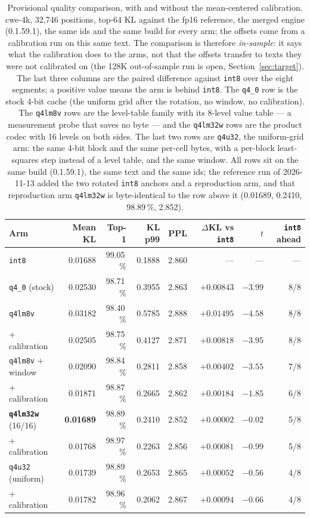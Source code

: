 \documentclass[10pt,twocolumn]{article}
\begin{document}
\begin{table}[t]
\centering
\footnotesize
\caption{Provisional quality comparison, with and without the mean-centered calibration. cwe-4k, 32,746 positions, top-64 KL against the fp16 reference, the merged engine (0.1.59.1), the same ids and the same build for every arm; the offsets come from a calibration run on this same text. The comparison is therefore \emph{in-sample}: it says what the calibration does to the arms, not that the offsets transfer to texts they were not calibrated on (the 128K out-of-sample run is open, Section~\ref{sec:target}). The last three columns are the paired difference against \texttt{int8} over the eight segments; a positive value means the arm is behind \texttt{int8}. The \texttt{q4\_0} row is the stock 4-bit cache (the uniform grid after the rotation, no window, no calibration). The \texttt{q4lm8v} rows are the level-table family with its 8-level value table --- a measurement probe that saves no byte --- and the \texttt{q4lm32w} rows are the product codec with 16 levels on both sides. The last two rows are \texttt{q4u32}, the uniform-grid arm: the same 4-bit block and the same per-cell bytes, with a per-block least-squares step instead of a level table, and the same window. All rows sit on the same build (0.1.59.1), the same text and the same ids; the reference run of 2026-11-13 added the two rotated \texttt{int8} anchors and a reproduction arm, and that reproduction arm \texttt{q4lm32w} is byte-identical to the row above it (0.01689, 0.2410, 98.89\,\%, 2.852).}
\label{tab:center}
\begin{tabular}{@{}lrrrrrrr@{}}
\toprule
Arm & Mean KL & Top-1 & KL p99 & PPL & $\Delta$KL vs \texttt{int8} & $t$ & \texttt{int8} ahead \\
\midrule
\texttt{int8} & 0.01688 & 99.05\,\% & 0.1888 & 2.860 & --- & --- & --- \\
\texttt{q4\_0} (stock) & 0.02530 & 98.71\,\% & 0.3955 & 2.863 & $+0.00843$ & $-3.99$ & 8/8 \\
\texttt{q4lm8v} & 0.03182 & 98.40\,\% & 0.5785 & 2.888 & $+0.01495$ & $-4.58$ & 8/8 \\
\quad + calibration & 0.02505 & 98.75\,\% & 0.4127 & 2.871 & $+0.00818$ & $-3.95$ & 8/8 \\
\texttt{q4lm8v} + window & 0.02090 & 98.84\,\% & 0.2811 & 2.858 & $+0.00402$ & $-3.55$ & 7/8 \\
\quad + calibration & 0.01871 & 98.87\,\% & 0.2665 & 2.862 & $+0.00184$ & $-1.85$ & 6/8 \\
\midrule
\textbf{\texttt{q4lm32w}} (16/16) & \textbf{0.01689} & 98.89\,\% & 0.2410 & 2.852 & $+0.00002$ & $-0.02$ & 5/8 \\
\quad + calibration & 0.01768 & 98.97\,\% & 0.2263 & 2.856 & $+0.00081$ & $-0.99$ & 5/8 \\
\midrule
\texttt{q4u32} (uniform) & 0.01739 & 98.89\,\% & 0.2653 & 2.865 & $+0.00052$ & $-0.56$ & 4/8 \\
\quad + calibration & 0.01782 & 98.96\,\% & 0.2062 & 2.867 & $+0.00094$ & $-0.66$ & 4/8 \\
\bottomrule
\end{tabular}
\end{table}
\end{document}
